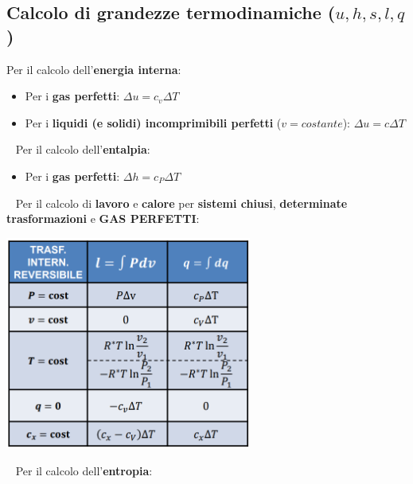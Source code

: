 \subsection{Calcolo di grandezze termodinamiche ($u, h, s, l, q$)}
Per il calcolo dell'\textbf{energia interna}:
\begin{itemize}
    \item Per i \textbf{gas perfetti}: $\Delta u = c_v \Delta T$
    \item Per i \textbf{liquidi (e solidi) incomprimibili perfetti} ($v = costante$): $\Delta u = c \Delta T$
\end{itemize}
\ \newline
\newline
Per il calcolo dell'\textbf{entalpia}:
\begin{itemize}
    \item Per i \textbf{gas perfetti}: $\Delta h = c_P \Delta T$
\end{itemize}
\ \newline
\newline
Per il calcolo di \textbf{lavoro} e \textbf{calore} per \textbf{sistemi chiusi}, \textbf{determinate trasformazioni} e \textbf{GAS PERFETTI}:
\begin{center}
    \includegraphics[height=7cm]{../L03/img11.PNG}
\end{center}
\ \newline
Per il calcolo dell'\textbf{entropia}:
